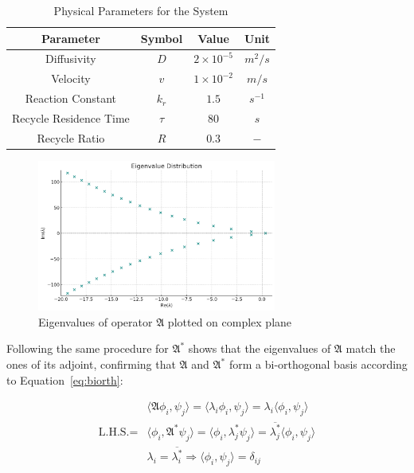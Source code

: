 \begin{table}[ht]
    \centering
    \caption{Physical Parameters for the System}
    \label{tab:pars}
    \begin{tabular}{|c|c|c|c|}
    \hline
    \textbf{Parameter}        & \textbf{Symbol} & \textbf{Value}     & \textbf{Unit}    \\ \hline
    Diffusivity               & $D$             & $2\times10^{-5}$   & ${m^2}/{s}$      \\ \hline
    Velocity                  & $v$             & $1\times10^{-2}$   & ${m}/{s}$        \\ \hline
    Reaction Constant         & $k_r$           & $1.5$              & $s^{-1}$         \\ \hline
    Recycle Residence Time    & $\tau$          & $80$               & $s$              \\ \hline
    Recycle Ratio             & $R$             & $0.3$              & $-$              \\ \hline
    \end{tabular}
\end{table}

\begin{figure}[ht]
    \centering
    \includegraphics[width=0.7\textwidth]{Figures/eigval_dist_R_0.3.jpg}
    \caption{Eigenvalues of operator $\mathfrak{A}$ plotted on complex plane}
    \label{fig:eigval_dist}
\end{figure}

Following the same procedure for $\mathfrak{A}^*$ shows that the eigenvalues of $\mathfrak{A}$ match the ones of its adjoint, confirming that $\mathfrak{A}$ and $\mathfrak{A}^*$ form a bi-orthogonal basis according to Equation~\ref{eq:biorth}:

\begin{equation} \label{eq:biorth}
    \begin{aligned}
        &\langle \mathfrak{A} \phi_i, \psi_j \rangle = \langle \lambda_i \phi_i, \psi_j \rangle = \lambda_i \langle \phi_i, \psi_j \rangle \\
        \text{L.H.S.} = &\langle \phi_i, \mathfrak{A}^* \psi_j \rangle = \langle \phi_i, \lambda_j^* \psi_j \rangle = \overline{\lambda_j^*} \langle \phi_i, \psi_j \rangle \\
        &\lambda_i = \overline{\lambda_i^*} \Rightarrow \langle \phi_i, \psi_j \rangle = \delta_{ij}
    \end{aligned}
\end{equation}

